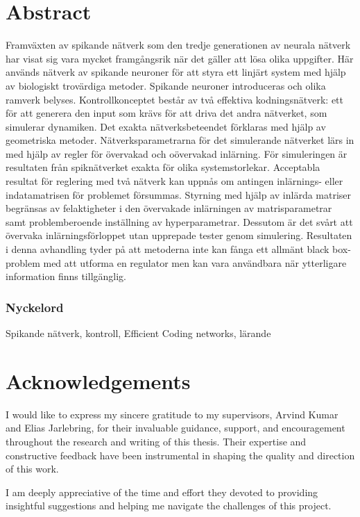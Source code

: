 \chapter*{Abstract}
Framväxten av spikande nätverk som den tredje generationen av neurala nätverk har visat sig vara mycket framgångsrik när det gäller att lösa olika uppgifter. Här används nätverk av spikande neuroner för att styra ett linjärt system med hjälp av biologiskt trovärdiga metoder. Spikande neuroner introduceras och olika ramverk belyses. Kontrollkonceptet består av två effektiva kodningsnätverk: ett för att generera den input som krävs för att driva det andra nätverket, som simulerar dynamiken. Det exakta nätverksbeteendet förklaras med hjälp av geometriska metoder. Nätverksparametrarna för det simulerande nätverket lärs in med hjälp av regler för övervakad och oövervakad inlärning. För simuleringen är resultaten från spiknätverket exakta för olika systemstorlekar. Acceptabla resultat för reglering med två nätverk kan uppnås om antingen inlärnings- eller indatamatrisen för problemet försummas. Styrning med hjälp av inlärda matriser begränsas av felaktigheter i den övervakade inlärningen av matrisparametrar samt problemberoende inställning av hyperparametrar. Dessutom är det svårt att övervaka inlärningsförloppet utan upprepade tester genom simulering.
Resultaten i denna avhandling tyder på att metoderna inte kan fånga ett allmänt black box-problem med att utforma en regulator men kan vara användbara när ytterligare information finns tillgänglig.

\subsection*{Nyckelord}
Spikande nätverk, kontroll, Efficient Coding networks, lärande

\newpage
\thispagestyle{plain}
\chapter*{Acknowledgements}


I would like to express my sincere gratitude to my supervisors, Arvind Kumar and Elias Jarlebring, for their invaluable guidance, support, and encouragement throughout the research and writing of this thesis. Their expertise and constructive feedback have been instrumental in shaping the quality and direction of this work.

I am deeply appreciative of the time and effort they devoted to providing insightful suggestions and helping me navigate the challenges of this project.

